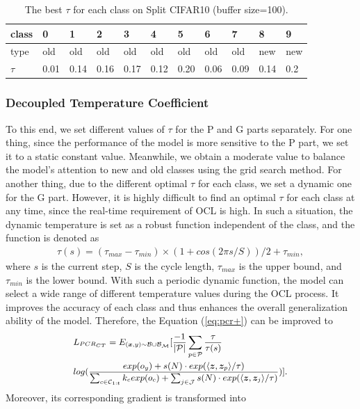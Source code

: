 \begin{table}[t]
\renewcommand\tabcolsep{4pt}
\centering
\caption{The best $\tau$ for each class on Split CIFAR10 (buffer size=100).}
\vspace{-1ex}
\label{table:tau}
\begin{tabular}{l|llllllllll}
\hline
class & 0    & 1    & 2    & 3    & 4    & 5    & 6    & 7    & 8    & 9    \\ \hline
type  & old  & old  & old  & old  & old  & old  & old  & old  & new  & new  \\
$\tau$     & 0.01 & 0.14 & 0.16 & 0.17 & 0.12 & 0.20 & 0.06 & 0.09 & 0.14& 0.2 \\ \hline
\end{tabular}
\vspace{-4ex}
\end{table}

\subsubsection{Decoupled Temperature Coefficient}
To this end, we set different values of $\tau$ for the P and G parts separately. For one thing, since the performance of the model is more sensitive to the P part, we set it to a static constant value. Meanwhile, we obtain a moderate value to balance the model's attention to new and old classes using the grid search method. For another thing, due to the different optimal $\tau$ for each class, we set a dynamic one for the G part. However, it is highly difficult to find an optimal $\tau$ for each class at any time, since the real-time requirement of OCL is high. In such a situation, the dynamic temperature is set as a robust function independent of the class, and the function is denoted as
\begin{equation}
\label{eq:tau_t}
 	\begin{split}
	 	\tau(s) = (\tau_{max}-\tau_{min})\times(1+cos(2\pi s/S))/2+\tau_{min},
 	\end{split}
\end{equation}
where $s$ is the current step, $S$ is the cycle length, $\tau_{max}$ is the upper bound, and $\tau_{min}$ is the lower bound. With such a periodic dynamic function, the model can select a wide range of different temperature values during the OCL process. It improves the accuracy of each class and thus enhances the overall generalization ability of the model. Therefore, the Equation (\ref{eq:pcr+}) can be improved to
\begin{equation}\small
\label{eq:pcr++}
\begin{split}
&
L_{PCR_{CT}}=E_{(\bm{x},y)\sim{\mathcal{B}\cup\mathcal{B}_\mathcal{M}}}[\frac{-1}{|\mathcal{P}|}\sum_{p\in\mathcal{P}}\frac{\tau}{\tau(s)}
    \\
    &
    log(\frac{exp(o_y)+s(N)\cdot exp(\langle \bm{z},\bm{z}_p\rangle/\tau)}{\sum_{c\in\mathcal{C}_{1:t}}k_c exp(o_c)+\sum_{j\in\mathcal{J}} s(N)\cdot exp(\langle\bm{z},\bm{z}_j\rangle/\tau)})].
\end{split}
\end{equation}
Moreover, its corresponding gradient is transformed into

